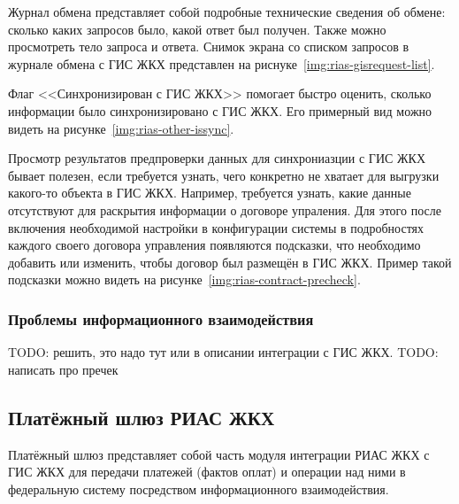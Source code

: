 

Журнал обмена представляет собой подробные технические сведения об обмене: сколько каких запросов было, какой ответ был получен.
Также можно просмотреть тело запроса и ответа.
Снимок экрана со списком запросов в журнале обмена с ГИС ЖКХ представлен на риснуке~\ref{img:rias-gisrequest-list}.


Флаг <<Синхронизирован с ГИС ЖКХ>> помогает быстро оценить, сколько информации было синхронизировано с ГИС ЖКХ.
Его примерный вид можно видеть на рисунке~\ref{img:rias-other-issync}.


Просмотр результатов предпроверки данных для синхрониазции с ГИС ЖКХ бывает полезен, если требуется узнать, чего конкретно не хватает для выгрузки какого-то объекта в ГИС ЖКХ.
Например, требуется узнать, какие данные отсутствуют для раскрытия информации о договоре упраления.
Для этого после включения необходимой настройки в конфигурации системы в подробностях каждого своего договора управления появляются подсказки, что необходимо добавить или изменить, чтобы договор был размещён в ГИС ЖКХ.
Пример такой подсказки можно видеть на рисунке~\ref{img:rias-contract-precheck}.


\subsubsection{Проблемы информационного взаимодействия}

TODO: решить, это надо тут или в описании интеграции с ГИС ЖКХ.
TODO: написать про пречек

\subsection{Платёжный шлюз РИАС ЖКХ}

Платёжный шлюз представляет собой часть модуля интеграции РИАС ЖКХ с ГИС ЖКХ для передачи платежей (фактов оплат) и операции над ними в федеральную систему посредством информационного взаимодействия.

